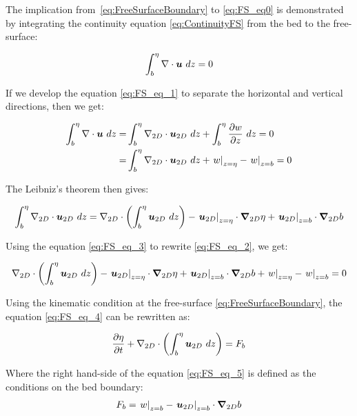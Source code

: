 The implication from~\eqref{eq:FreeSurfaceBoundary} to \eqref{eq:FS_eq0} is demonstrated by integrating the continuity equation \eqref{eq:ContinuityFS} from the bed to the free-surface:

\begin{align}
  \int_b^\eta\nabla \cdot\bm{u}~dz = 0
  \label{eq:FS_eq_1}
\end{align}

If we develop the equation \eqref{eq:FS_eq_1} to separate the horizontal and vertical directions, then we get:

\begin{align}
  \int_b^\eta\nabla \cdot\bm{u}~dz =& \int_b^\eta\nabla_{2D} \cdot\bm{u}_{2D}~dz +\int_b^\eta\dfrac{\partial w}{\partial z}~dz = 0
  \notag\\
  =& \int_b^\eta\nabla_{2D} \cdot\bm{u}_{2D}~dz + \left.w\right\rvert_{z=\eta} - \left.w\right\rvert_{z=b} = 0
  \label{eq:FS_eq_2}
\end{align}

The Leibniz's theorem then gives:

\begin{align}
  \int_b^\eta\nabla_{2D} \cdot\bm{u}_{2D}~dz = \nabla_{2D} \cdot\left(\int_b^\eta\bm{u}_{2D}~dz\right)
  - \left.\bm{u}_{2D}\right\rvert_{z=\eta}\cdot\bm{\nabla}_{2D}\eta
  + \left.\bm{u}_{2D}\right\rvert_{z=b}\cdot\bm{\nabla}_{2D}b
  \label{eq:FS_eq_3}
\end{align}

Using the equation \eqref{eq:FS_eq_3} to rewrite \eqref{eq:FS_eq_2}, we get:

\begin{align}
  \nabla_{2D} \cdot\left(\int_b^\eta\bm{u}_{2D}~dz\right) - \left.\bm{u}_{2D}\right\rvert_{z=\eta}\cdot\bm{\nabla}_{2D}\eta + \left.\bm{u}_{2D}\right\rvert_{z=b}\cdot\bm{\nabla}_{2D}b + \left.w\right\rvert_{z=\eta} - \left.w\right\rvert_{z=b} = 0
  \label{eq:FS_eq_4}
\end{align}

Using the kinematic condition at the free-surface \eqref{eq:FreeSurfaceBoundary}, the equation \eqref{eq:FS_eq_4} can be rewritten as:

\begin{align}
  \dfrac{\partial\eta}{\partial t} + \nabla_{2D} \cdot\left(\int_b^\eta\bm{u}_{2D}~dz\right) = F_b\notag \\
  \label{eq:FS_eq_5}
\end{align}

Where the right hand-side of the equation \eqref{eq:FS_eq_5} is defined as the conditions on the bed boundary:
\begin{align}
  F_b =
  \left.w\right\rvert_{z=b} - \left.\bm{u}_{2D}\right\rvert_{z=b}\cdot\bm{\nabla}_{2D}b
\end{align}

